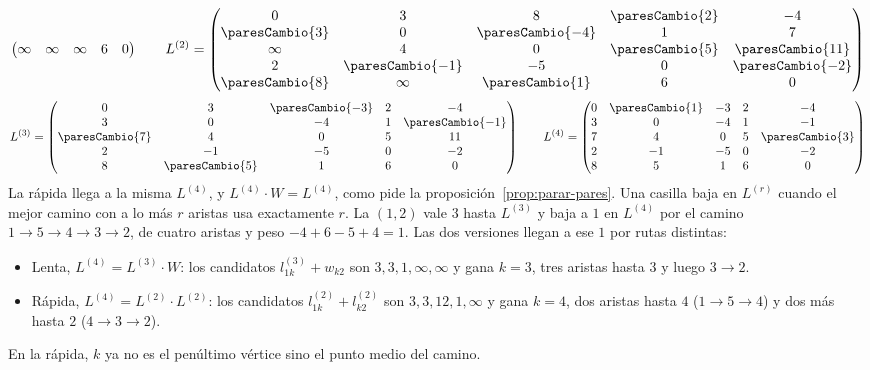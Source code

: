 \documentclass[11pt,letterpaper]{article}
\begin{document}
\begin{ejemplo}
{\[\begin{pmatrix}
    \infty & \infty & \infty & 6 & 0
  \end{pmatrix}
  \qquad
  L^{(2)} = \begin{pmatrix}
    0 & 3 & 8 & \paresCambio{2} & -4 \\
    \paresCambio{3} & 0 & \paresCambio{-4} & 1 & 7 \\
    \infty & 4 & 0 & \paresCambio{5} & \paresCambio{11} \\
    2 & \paresCambio{-1} & -5 & 0 & \paresCambio{-2} \\
    \paresCambio{8} & \infty & \paresCambio{1} & 6 & 0
  \end{pmatrix}
  \]
  \[
  L^{(3)} = \begin{pmatrix}
    0 & 3 & \paresCambio{-3} & 2 & -4 \\
    3 & 0 & -4 & 1 & \paresCambio{-1} \\
    \paresCambio{7} & 4 & 0 & 5 & 11 \\
    2 & -1 & -5 & 0 & -2 \\
    8 & \paresCambio{5} & 1 & 6 & 0
  \end{pmatrix}
  \qquad
  L^{(4)} = \begin{pmatrix}
    0 & \paresCambio{1} & -3 & 2 & -4 \\
    3 & 0 & -4 & 1 & -1 \\
    7 & 4 & 0 & 5 & \paresCambio{3} \\
    2 & -1 & -5 & 0 & -2 \\
    8 & 5 & 1 & 6 & 0
  \end{pmatrix}
  \]
  }%
  La rápida llega a la misma $L^{(4)}$, y $L^{(4)} \cdot W = L^{(4)}$,
  como pide la proposición~\ref{prop:parar-pares}. Una casilla baja en
  $L^{(r)}$ cuando el mejor camino con a lo más $r$ aristas usa
  exactamente $r$. La $(1, 2)$ vale $3$ hasta $L^{(3)}$ y baja a $1$
  en $L^{(4)}$ por el camino $1 \to 5 \to 4 \to 3 \to 2$, de cuatro
  aristas y peso $-4 + 6 - 5 + 4 = 1$. Las dos versiones llegan a ese
  $1$ por rutas distintas:
  \begin{itemize}[itemsep=0.1em]
    \item Lenta, $L^{(4)} = L^{(3)} \cdot W$: los candidatos
          $l^{(3)}_{1k} + w_{k2}$ son $3, 3, 1, \infty, \infty$ y gana
          $k = 3$, tres aristas hasta $3$ y luego $3 \to 2$.
    \item Rápida, $L^{(4)} = L^{(2)} \cdot L^{(2)}$: los candidatos
          $l^{(2)}_{1k} + l^{(2)}_{k2}$ son $3, 3, 12, 1, \infty$ y
          gana $k = 4$, dos aristas hasta $4$ ($1 \to 5 \to 4$) y dos
          más hasta $2$ ($4 \to 3 \to 2$).
  \end{itemize}
  En la rápida, $k$ ya no es el penúltimo vértice sino el punto medio
  del camino.
\end{ejemplo}
\end{document}
